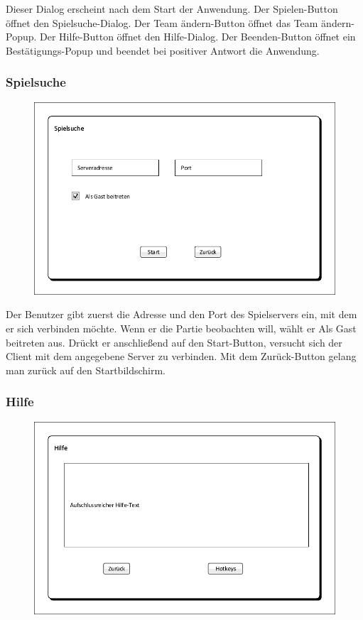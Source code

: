 Dieser Dialog erscheint nach dem Start der Anwendung. Der \glqq{}Spielen\grqq{}-Button öffnet den Spielsuche-Dialog. Der \glqq{}Team ändern\grqq{}-Button öffnet das \glqq{}Team ändern\grqq{}-Popup. Der \glqq{}Hilfe\grqq{}-Button öffnet den Hilfe-Dialog. Der \glqq{}Beenden\grqq{}-Button öffnet ein Bestätigungs-Popup und beendet bei positiver Antwort die Anwendung.

\subsubsection{Spielsuche}
\begin{figure}[H]
    \centering
    \includegraphics[scale=0.8]{images/Spielsuche.pdf}
\end{figure}

Der Benutzer gibt zuerst die Adresse und den Port des Spielservers ein, mit dem er sich verbinden möchte. Wenn er die Partie beobachten will, wählt er \glqq{}Als Gast beitreten\grqq{} aus. Drückt er anschließend auf den \glqq{}Start\grqq{}-Button, versucht sich der Client mit dem angegebene Server zu verbinden. Mit dem \glqq{}Zurück\grqq{}-Button gelang man zurück auf den Startbildschirm.

\subsubsection{Hilfe}
\begin{figure}[H]
    \centering
    \includegraphics[scale=0.8]{images/Hilfe.pdf}
\end{figure}

